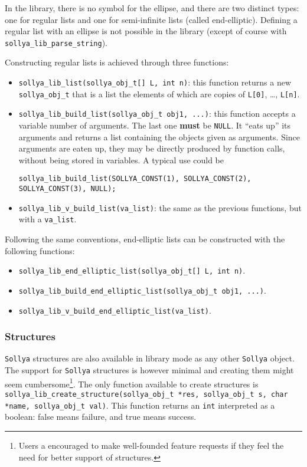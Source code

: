 \documentclass[a4paper]{article}
\newcommand{\sollya}{\texttt{Sollya}\xspace}
\begin{document}
In the library, there is no symbol for the ellipse, and there are two distinct types: one for regular lists and one for semi-infinite lists (called end-elliptic). Defining a regular list with an ellipse is not possible in the library (except of course with \texttt{sollya\_lib\_parse\_string}).

Constructing regular lists is achieved through three functions:
\begin{itemize}
\item \verb|sollya_lib_list(sollya_obj_t[] L, int n)|: this function returns a new \verb|sollya_obj_t| that is a list the elements of which are copies of \verb|L[0]|, \dots, \verb|L[n]|.
\item \verb|sollya_lib_build_list(sollya_obj_t obj1, ...)|: this function accepts a variable number of arguments. The last one \textbf{must} be \texttt{NULL}. It ``eats up'' its arguments and returns a list containing the objects given as arguments. Since arguments are eaten up, they may be directly produced by function calls, without being stored in variables. A typical use could be
  \begin{center}
    \verb|sollya_lib_build_list(SOLLYA_CONST(1), SOLLYA_CONST(2), SOLLYA_CONST(3), NULL);|
  \end{center}
\item \verb|sollya_lib_v_build_list(va_list)|: the same as the previous functions, but with a \texttt{va\_list}.
\end{itemize}

Following the same conventions, end-elliptic lists can be constructed with the following functions:
\begin{itemize}
\item \verb|sollya_lib_end_elliptic_list(sollya_obj_t[] L, int n)|.
\item \verb|sollya_lib_build_end_elliptic_list(sollya_obj_t obj1, ...)|.
\item \verb|sollya_lib_v_build_end_elliptic_list(va_list)|.
\end{itemize}

\subsubsection{Structures}
\label{creating_structures}
\sollya structures are also available in library mode as any other \sollya object. The support for \sollya structures is however minimal and creating them might seem cumbersome\footnote{Users a encouraged to make well-founded feature requests if they feel the need for better support of structures.}. The only function available to create structures is\\
\verb|sollya_lib_create_structure(sollya_obj_t *res, sollya_obj_t s, char *name, sollya_obj_t val)|.
This function returns an \verb|int| interpreted as a boolean: false means failure, and true means success.
\end{document}
